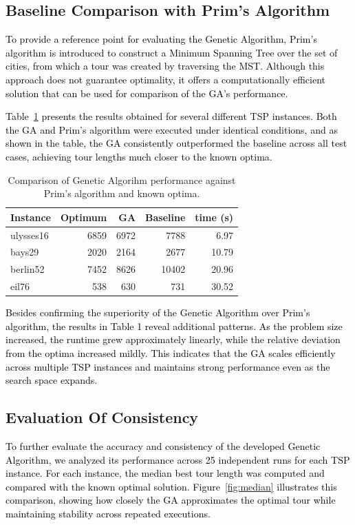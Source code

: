 \documentclass{scrartcl}
\begin{document}
\subsection{Baseline Comparison with Prim’s Algorithm}

\textcolor{black}{To provide a reference point for evaluating the Genetic Algorithm, Prim's algorithm is introduced to construct a Minimum Spanning Tree over the set of cities, from which a tour was created by traversing the MST. Although this approach does not guarantee optimality, it offers a computationally efficient solution that can be used for comparison of the GA's performance.}

\textcolor{black}{Table~\ref{tab:results_example} presents the results obtained for several different TSP instances. Both the GA and Prim’s algorithm were executed under identical conditions, and as shown in the table, the GA consistently outperformed the baseline across all test cases, achieving tour lengths much closer to the known optima.}

\begin{table}[h]
\centering
\caption{Comparison of Genetic Algorihm performance against Prim's algorithm and known optima.}
\label{tab:results_example}
	\begin{tabular}{lrrrr}
	\toprule
	\textbf{Instance} & \textbf{Optimum} & \textbf{GA} & \textbf{Baseline} & \textbf{time (s)}\\
	\midrule
	ulysses16   &  6859      & 6972	& 7788  & 6.97   \\
	bays29      &  2020      & 2164	& 2677  & 10.79  \\
	berlin52    &  7452      & 8626	& 10402 & 20.96  \\
	eil76       &  538       & 630	& 731   & 30.52  \\
	\bottomrule
	\end{tabular}
\end{table}

\textcolor{black}{Besides confirming the superiority of the Genetic Algorithm over Prim's algorithm, the results in Table 1 reveal additional patterns. As the problem size increased, the runtime grew approximately linearly, while the relative deviation from the optima increased mildly. This indicates that the GA scales efficiently across multiple TSP instances and maintains strong performance even as the search space expands.}

\subsection{Evaluation Of Consistency}
\textcolor{black}{
To further evaluate the accuracy and consistency of the developed Genetic Algorithm, we analyzed its performance across 25 independent runs for each TSP instance. 
For each instance, the median best tour length was computed and compared with the known optimal solution. 
Figure~\ref{fig:median} illustrates this comparison, showing how closely the GA approximates the optimal tour while maintaining stability across repeated executions.
}
\end{document}
